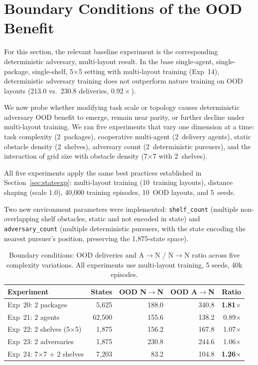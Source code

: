 \documentclass[sigconf]{aamas}
\DeclareRobustCommand{\codepath}[1]{\nolinkurl{#1}}
\begin{document}
\section{Boundary Conditions of the OOD Benefit}
\label{sec:boundary}

For this section, the relevant baseline experiment is the corresponding deterministic adversary, multi-layout result. In the base single-agent,
single-package, single-shelf, 5$\times$5 setting with multi-layout training
(Exp~14), deterministic adversary training does not outperform nature training
on OOD layouts (213.0 vs.\ 230.8 deliveries, $0.92\times$).

We now probe whether modifying task scale or topology causes deterministic adversary
OOD benefit to emerge, remain near parity, or further decline under multi-layout training.
We ran five experiments that vary one dimension at a time: task complexity (2~packages),
cooperative multi-agent (2~delivery agents), static obstacle density (2~shelves),
adversary count (2~deterministic pursuers), and the interaction of grid size with obstacle density (7$\times$7 with 2~shelves).

All five experiments apply the same best practices established in
Section~\ref{sec:stateexp}: multi-layout training (10~training layouts),
distance shaping (scale 1.0), 40{,}000 training episodes, 10~OOD layouts,
and 5~seeds.

Two new environment parameters were implemented: \codepath{shelf_count} (multiple
non-overlapping shelf obstacles, static and not encoded in state) and
\codepath{adversary_count} (multiple deterministic pursuers, with the state encoding
the nearest pursuer's position, preserving the 1{,}875-state space).

\begin{table}[H]
\caption{Boundary conditions: OOD deliveries and A$\to$N / N$\to$N ratio across five
         complexity variations. All experiments use multi-layout training, 5 seeds,
         40k episodes.}
\label{tab:boundary}
\centering
\footnotesize
\begin{tabular}{lrrrr}
\toprule
\textbf{Experiment} & \textbf{States} & \textbf{OOD N$\to$N} & \textbf{OOD A$\to$N} & \textbf{Ratio} \\
\midrule
Exp~20: 2 packages               & 5,625  & 188.0 & 340.8 & \textbf{1.81$\times$} \\
Exp~21: 2 agents                 & 62,500 & 155.6 & 138.2 & 0.89$\times$ \\
Exp~22: 2 shelves (5$\times$5)  & 1,875  & 156.2 & 167.8 & 1.07$\times$ \\
Exp~23: 2 adversaries            & 1,875  & 230.8 & 244.6 & 1.06$\times$ \\
Exp~24: 7$\times$7 + 2 shelves  & 7,203  & 83.2  & 104.8 & \textbf{1.26$\times$} \\
\bottomrule
\end{tabular}
\end{table}
\end{document}
